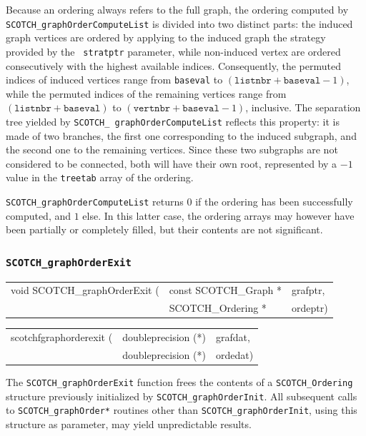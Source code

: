 \begin{itemize}
Because an ordering always refers to the full graph, the ordering
computed by {\tt SCOTCH\_\lbt graph\lbt Order\lbt Compute\lbt List} is
divided into two distinct parts: the induced graph vertices are ordered
by applying to the induced graph the strategy provided by the {\tt
stratptr} parameter, while non-induced vertex are ordered
consecutively with the highest available indices. Consequently, the
permuted indices of induced vertices range from {\tt baseval} to
$(\mathtt{listnbr} + \mathtt{baseval} - 1)$, while the permuted
indices of the remaining vertices range from $(\mathtt{listnbr} +
\mathtt{baseval})$ to $(\mathtt{vertnbr} + \mathtt{baseval} -
1)$, inclusive. The separation tree yielded by {\tt SCOTCH\_\lbt
graph\lbt Order\lbt Compute\lbt List} reflects this property: it
is made of two branches, the first one corresponding to the induced
subgraph, and the second one to the remaining vertices. Since these
two subgraphs are not considered to be connected, both will have their
own root, represented by a $-1$ value in the {\tt treetab} array of the
ordering.

\progret

{\tt SCOTCH\_graphOrderComputeList} returns $0$ if the ordering has been
successfully computed, and $1$ else. In this latter case, the ordering
arrays may however have been partially or completely filled, but their
contents are not significant.
\end{itemize}

\subsubsection{{\tt SCOTCH\_graphOrderExit}}

\begin{itemize}
\progsyn

{\tt\begin{tabular}{l@{}ll}
void SCOTCH\_graphOrderExit ( & const SCOTCH\_Graph * & grafptr, \\
                              & SCOTCH\_Ordering *    & ordeptr)
\end{tabular}}

{\tt\begin{tabular}{l@{}ll}
scotchfgraphorderexit ( & doubleprecision (*) & grafdat, \\
                        & doubleprecision (*) & ordedat)
\end{tabular}}

\progdes

The {\tt SCOTCH\_graphOrderExit} function frees the contents of a
{\tt SCOTCH\_\lbt Ordering} structure previously initialized by
{\tt SCOTCH\_\lbt graph\lbt Order\lbt Init}. All subsequent calls to
{\tt SCOTCH\_\lbt graph\lbt Order*} routines other than
{\tt SCOTCH\_\lbt graph\lbt Order\lbt Init}, using this structure
as parameter, may yield unpredictable results.
\end{itemize}

